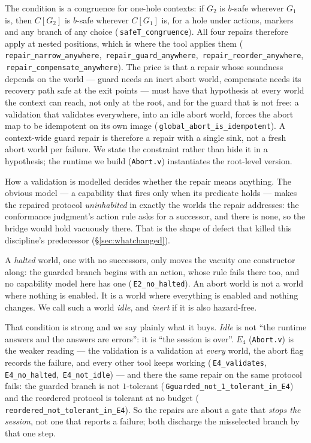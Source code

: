 \documentclass[a4paper,UKenglish,cleveref,autoref,thm-restate,anonymous]{lipics-v2021}
\newcommand{\coqok}[1]{\textcolor{okgreen}{\ding{51}}\,\texttt{\small #1}}
\begin{document}
\begin{theorem}\label{thm:congruence}
The condition is a congruence for one-hole contexts: if $G_2$ is $b$-safe
wherever $G_1$ is, then $C[G_2]$ is $b$-safe wherever $C[G_1]$ is, for a hole
under actions, markers and any branch of any choice
(\coqok{safeT\_congruence}). All four repairs therefore apply at nested
positions, which is where the tool applies them
(\coqok{repair\_narrow\_anywhere}, \coqok{repair\_guard\_anywhere},
\coqok{repair\_reorder\_anywhere}, \coqok{repair\_compensate\_anywhere}). The
price is that a repair whose soundness depends on the world --- guard needs an
inert abort world, compensate needs its recovery path safe at the exit points
--- must have that hypothesis at every world the context can reach, not only
at the root, and for the guard that is not free: a validation that validates
everywhere, into an idle abort world, forces the abort map to be idempotent on
its own image (\coqok{global\_abort\_is\_idempotent}). A context-wide guard
repair is therefore a repair with a single sink, not a fresh abort world per
failure. We state the constraint rather than hide it in a hypothesis; the
runtime we build (\texttt{Abort.v}) instantiates the root-level version.
\end{theorem}

How a validation is modelled decides whether the repair means anything. The
obvious model --- a capability that fires only when its predicate holds ---
makes the repaired protocol \emph{uninhabited} in exactly the worlds the repair
addresses: the conformance judgment's action rule asks for a successor, and
there is none, so the bridge would hold vacuously there. That is the shape of
defect that killed this discipline's predecessor (\S\ref{sec:whatchanged}).

A \emph{halted} world, one with no successors, only moves the vacuity one
constructor along: the guarded branch begins with an action, whose rule fails
there too, and no capability model here has one (\coqok{E2\_no\_halted}). An abort world is not a world where nothing is
enabled. It is a world where everything is enabled and nothing changes. We call
such a world \emph{idle}, and \emph{inert} if it is also hazard-free.

That condition is strong and we say plainly what it buys. \emph{Idle} is not
``the runtime answers and the answers are errors'': it is ``the session is
over''. $E_4$ (\texttt{Abort.v}) is the weaker reading --- the validation is a
validation at \emph{every} world, the abort flag records the failure, and every
other tool keeps working (\coqok{E4\_validates}, \coqok{E4\_no\_halted},
\coqok{E4\_not\_idle}) --- and there the same repair on the same protocol
fails: the guarded branch is not $1$-tolerant
(\coqok{Gguarded\_not\_1\_tolerant\_in\_E4}) and the reordered protocol is
tolerant at no budget (\coqok{reordered\_not\_tolerant\_in\_E4}). So the
repairs are about a gate that \emph{stops the session}, not one that reports a
failure; both discharge the misselected branch by that one step.
\end{document}
